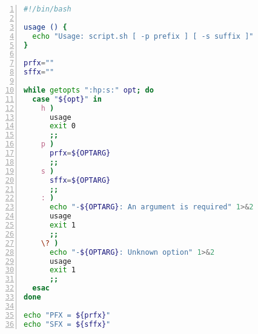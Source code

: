 \documentclass[a4paper,12pt,%
              final%
              ]{article}
\begin{document}
\appendix
\begin{lstlisting}[language=bash,numbers=left,float,frame=single,caption={script.sh, an example for \texttt{getopts}},label={lst:getopt_ex},numberfirstline=true,stepnumber=5,firstnumber=1]
#!/bin/bash

usage () {
  echo "Usage: script.sh [ -p prefix ] [ -s suffix ]"
}

prfx=""
sffx=""

while getopts ":hp:s:" opt; do
  case "${opt}" in
    h )
      usage
      exit 0
      ;;
    p )
      prfx=${OPTARG}
      ;;
    s )
      sffx=${OPTARG}
      ;;
    : )
      echo "-${OPTARG}: An argument is required" 1>&2
      usage
      exit 1
      ;;
    \? )
      echo "-${OPTARG}: Unknown option" 1>&2
      usage
      exit 1
      ;;
  esac
done

echo "PFX = ${prfx}"
echo "SFX = ${sffx}"
\end{lstlisting}
\end{document}
